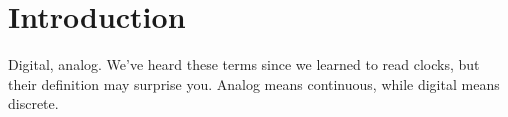 \section{Introduction}
Digital, analog. We've heard these terms since we learned to read clocks,
but their definition may surprise you. Analog means continuous, while
digital means discrete.